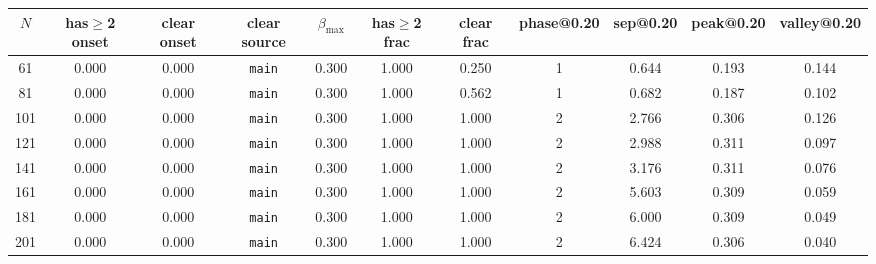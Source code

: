 \begin{tabular}{ccccccccccc}
\toprule
$N$ & has$\geq$2 onset & clear onset & clear source & $\beta_{\max}$ & has$\geq$2 frac & clear frac & phase@0.20 & sep@0.20 & peak@0.20 & valley@0.20 \\
\midrule
61 & 0.000 & 0.000 & \texttt{main} & 0.300 & 1.000 & 0.250 & 1 & 0.644 & 0.193 & 0.144 \\
81 & 0.000 & 0.000 & \texttt{main} & 0.300 & 1.000 & 0.562 & 1 & 0.682 & 0.187 & 0.102 \\
101 & 0.000 & 0.000 & \texttt{main} & 0.300 & 1.000 & 1.000 & 2 & 2.766 & 0.306 & 0.126 \\
121 & 0.000 & 0.000 & \texttt{main} & 0.300 & 1.000 & 1.000 & 2 & 2.988 & 0.311 & 0.097 \\
141 & 0.000 & 0.000 & \texttt{main} & 0.300 & 1.000 & 1.000 & 2 & 3.176 & 0.311 & 0.076 \\
161 & 0.000 & 0.000 & \texttt{main} & 0.300 & 1.000 & 1.000 & 2 & 5.603 & 0.309 & 0.059 \\
181 & 0.000 & 0.000 & \texttt{main} & 0.300 & 1.000 & 1.000 & 2 & 6.000 & 0.309 & 0.049 \\
201 & 0.000 & 0.000 & \texttt{main} & 0.300 & 1.000 & 1.000 & 2 & 6.424 & 0.306 & 0.040 \\
\bottomrule
\end{tabular}